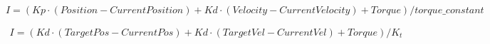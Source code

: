 \documentclass{article}
\begin{document}
\[ I = (Kp \cdot (Position - CurrentPosition) + Kd \cdot (Velocity - CurrentVelocity) + Torque) / torque\_constant \]
\pagebreak

\begin{eqnarray*} I=(Kd \cdot (TargetPos-CurrentPos)+Kd \cdot (TargetVel-CurrentVel)+Torque)/K_t \end{eqnarray*}
\pagebreak
\end{document}
